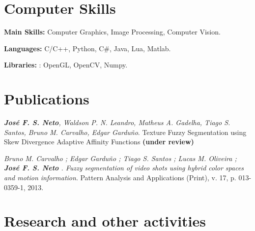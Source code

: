 \documentclass[letterpaper]{article}
\renewenvironment{itemize}{
  \begin{list}{}{
      \setlength{\leftmargin}{1.5em}
    }
  }{
  \end{list}
}
\begin{document}
\section*{Computer Skills}

\begin{itemize}
 \item \textbf{Main Skills:} Computer Graphics, Image Processing, Computer Vision.
  \item \textbf{Languages:} C/C++, Python, C\#, Java, Lua, Matlab.
  \item \textbf{Libraries:} : OpenGL, OpenCV, Numpy.

\end{itemize}

\section*{Publications}

\begin{itemize}

  \item \textit{\textbf{Jos\'e F. S. Neto}, Waldson P. N. Leandro, Matheus A. Gadelha, Tiago S. Santos, Bruno M. Carvalho, Edgar Gardu\~no}. Texture Fuzzy Segmentation using Skew Divergence Adaptive Affinity Functions \textbf{(under review)}

  \item \textit{Bruno M. Carvalho ; Edgar Gardu\~no ; Tiago S. Santos ; Lucas M. Oliveira ; \textbf{Jos\'e F. S. Neto} . Fuzzy segmentation of video shots using hybrid color spaces and motion
  information}. Pattern Analysis and Applications (Print), v. 17, p. 013-0359-1, 2013. \\

\end{itemize}

\section*{Research and other activities}
\end{document}
